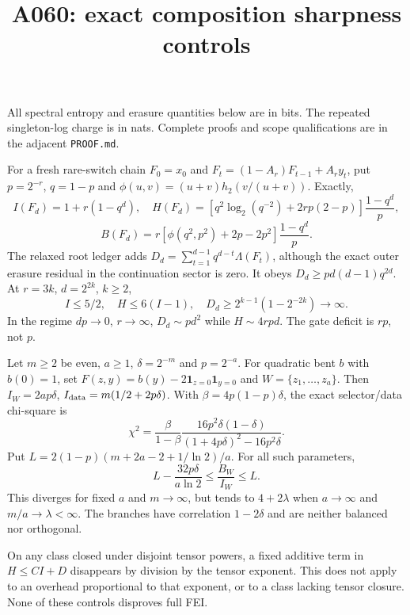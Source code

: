 \documentclass{article}
\begin{document}
\title{A060: exact composition sharpness controls}\maketitle
All spectral entropy and erasure quantities below are in bits. The repeated
singleton-log charge is in nats. Complete proofs and scope qualifications
are in the adjacent \texttt{PROOF.md}.

For a fresh rare-switch chain $F_0=x_0$ and
$F_t=(1-A_r)F_{t-1}+A_r y_t$, put $p=2^{-r}$, $q=1-p$ and
$\phi(u,v)=(u+v)h_2(v/(u+v))$. Exactly,
\[
 I(F_d)=1+r(1-q^d),\quad
 H(F_d)=\left[q^2\log_2(q^{-2})+2rp(2-p)\right]\frac{1-q^d}{p},
\]
\[
 B(F_d)=r\left[\phi(q^2,p^2)+2p-2p^2\right]\frac{1-q^d}{p}.
\]
The relaxed root ledger adds
$D_d=\sum_{t=1}^{d-1}q^{d-t}\Lambda(F_t)$, although the exact
outer erasure residual in the continuation sector is zero. It obeys
$D_d\ge p d(d-1)q^{2d}$. At $r=3k$, $d=2^{2k}$, $k\ge2$,
\[
 I\le5/2,\quad H\le6(I-1),\quad
 D_d\ge2^{k-1}(1-2^{-2k})\longrightarrow\infty.
\]
In the regime $dp\to0$, $r\to\infty$, $D_d\sim pd^2$ while
$H\sim4rpd$. The gate deficit is $rp$, not $p$.

Let $m\ge2$ be even, $a\ge1$, $\delta=2^{-m}$ and $p=2^{-a}$.
For quadratic bent $b$ with $b(0)=1$, set
$F(z,y)=b(y)-2\mathbf1_{z=0}\mathbf1_{y=0}$ and $W=\{z_1,\ldots,z_a\}$.
Then $I_W=2ap\delta$, $I_{\rm data}=m(1/2+2p\delta)$.
With $\beta=4p(1-p)\delta$, the exact selector/data chi-square is
\[
 \chi^2=\frac{\beta}{1-\beta}
 \frac{16p^2\delta(1-\delta)}{(1+4p\delta)^2-16p^2\delta}.
\]
Put $L=2(1-p)(m+2a-2+1/\ln2)/a$. For all such parameters,
\[
 L-\frac{32p\delta}{a\ln2}\le\frac{B_W}{I_W}\le L.
\]
This diverges for fixed $a$ and $m\to\infty$, but tends to $4+2\lambda$
when $a\to\infty$ and $m/a\to\lambda<\infty$. The branches have
correlation $1-2\delta$ and are neither balanced nor orthogonal.

On any class closed under disjoint tensor powers, a fixed additive term in
$H\le CI+D$ disappears by division by the tensor exponent. This does not
apply to an overhead proportional to that exponent, or to a class lacking
tensor closure. None of these controls disproves full FEI.
\end{document}
